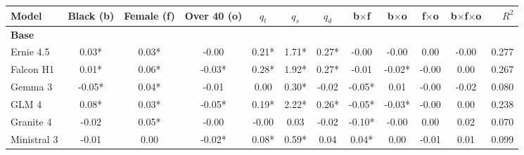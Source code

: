\begin{table}[p]
\centering
\scriptsize
\setlength{\tabcolsep}{5pt}
\renewcommand{\arraystretch}{1.18}
\begin{tabular}{lccccccccccr}
\toprule
Model & Black (b) & Female (f) & Over 40 (o) & $q_t$ & $q_s$ & $q_d$ & b$\times$f & b$\times$o & f$\times$o & b$\times$f$\times$o & $R^2$ \\
\midrule
\multicolumn{12}{l}{\textbf{Base}} \\
Ernie 4.5 & \cellcolor[HTML]{AAE5C6}0.03* & \cellcolor[HTML]{C7EED9}0.03* & \cellcolor[HTML]{FEFAFA}-0.00 & \cellcolor[HTML]{A8E4C5}0.21* & \cellcolor[HTML]{92DDB6}1.71* & \cellcolor[HTML]{87DAAE}0.27* & \cellcolor[HTML]{FFFCFC}-0.00 & \cellcolor[HTML]{FEF6F5}-0.00 & \cellcolor[HTML]{EBF9F1}0.00 & \cellcolor[HTML]{FDEEED}-0.00 & 0.277 \\
Falcon H1 & \cellcolor[HTML]{D8F3E5}0.01* & \cellcolor[HTML]{93DDB7}0.06* & \cellcolor[HTML]{F9D1CD}-0.03* & \cellcolor[HTML]{8BDBB1}0.28* & \cellcolor[HTML]{85D9AD}1.92* & \cellcolor[HTML]{87DAAF}0.27* & \cellcolor[HTML]{FDF2F1}-0.01 & \cellcolor[HTML]{F1938A}-0.02* & \cellcolor[HTML]{FFFEFE}-0.00 & \cellcolor[HTML]{F8FDFA}0.00 & 0.267 \\
Gemma 3 & \cellcolor[HTML]{F08E84}-0.05* & \cellcolor[HTML]{B0E6CA}0.04* & \cellcolor[HTML]{FEF5F4}-0.01 & \cellcolor[HTML]{FDFEFE}0.00 & \cellcolor[HTML]{ECF9F2}0.30* & \cellcolor[HTML]{FEF6F5}-0.02 & \cellcolor[HTML]{F3A9A2}-0.05* & \cellcolor[HTML]{8DDBB2}0.01 & \cellcolor[HTML]{FBDEDB}-0.00 & \cellcolor[HTML]{EA6557}-0.02 & 0.080 \\
GLM 4 & \cellcolor[HTML]{2EBE73}0.08* & \cellcolor[HTML]{C8EEDA}0.03* & \cellcolor[HTML]{F5B2AB}-0.05* & \cellcolor[HTML]{AEE6C8}0.19* & \cellcolor[HTML]{72D3A0}2.22* & \cellcolor[HTML]{8BDBB2}0.26* & \cellcolor[HTML]{F2A199}-0.05* & \cellcolor[HTML]{E74C3C}-0.03* & \cellcolor[HTML]{FBE2DF}-0.00 & \cellcolor[HTML]{FCFEFD}0.00 & 0.238 \\
Granite 4 & \cellcolor[HTML]{FADAD6}-0.02 & \cellcolor[HTML]{A5E3C3}0.05* & \cellcolor[HTML]{FEF8F7}-0.00 & \cellcolor[HTML]{FFFEFE}-0.00 & \cellcolor[HTML]{FDFEFE}0.03 & \cellcolor[HTML]{FEF8F8}-0.02 & \cellcolor[HTML]{E74C3C}-0.10* & \cellcolor[HTML]{FBE1DF}-0.00 & \cellcolor[HTML]{DFF5EA}0.00 & \cellcolor[HTML]{30BF74}0.02 & 0.070 \\
Ministral 3 & \cellcolor[HTML]{FDEDEB}-0.01 & \cellcolor[HTML]{FDFFFE}0.00 & \cellcolor[HTML]{FADCD8}-0.02* & \cellcolor[HTML]{DEF5E9}0.08* & \cellcolor[HTML]{D9F3E6}0.59* & \cellcolor[HTML]{EEFAF3}0.04 & \cellcolor[HTML]{B7E8CF}0.04* & \cellcolor[HTML]{E4F6ED}0.00 & \cellcolor[HTML]{F4AEA7}-0.01 & \cellcolor[HTML]{89DAB0}0.01 & 0.099 \\

\end{tabular}
\end{table}
